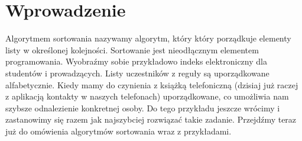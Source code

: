 \documentclass[knowledge.tex]{subfiles}
\begin{document}
    \section{Wprowadzenie}
    Algorytmem sortowania nazywamy algorytm, który który porządkuje elementy listy w określonej kolejności. Sortowanie jest nieodłącznym elementem programowania. Wyobraźmy sobie przykładowo indeks elektroniczny dla studentów i prowadzących. Listy uczestników z reguły są uporządkowane alfabetycznie. Kiedy mamy do czynienia z książką telefoniczną (dzisiaj już raczej z aplikacją kontakty w naszych telefonach) uporządkowane, co umożliwia nam szybsze odnalezienie konkretnej osoby. Do tego przykładu jeszcze wrócimy i zastanowimy się razem jak najszybciej rozwiązać takie zadanie. Przejdźmy teraz już do omówienia algorytmów sortowania wraz z przykładami.
\end{document}
